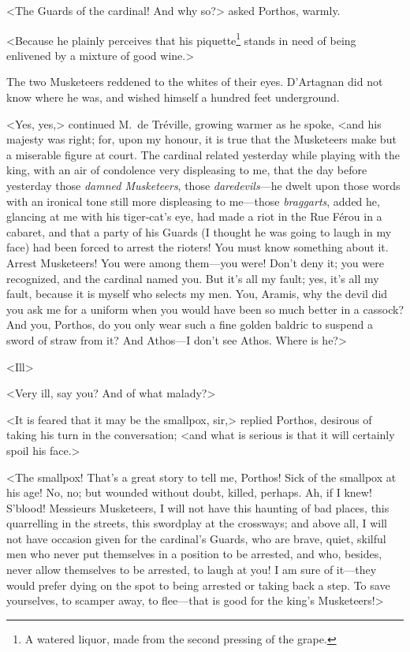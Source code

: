 <The Guards of the cardinal! And why so?> asked Porthos, warmly. 

<Because he plainly perceives that his piquette\footnote{A watered liquor, made from the second pressing of the grape.} stands in need of being enlivened by a mixture of good wine.> 

The two Musketeers reddened to the whites of their eyes. D'Artagnan did not know where he was, and wished himself a hundred feet underground. 

<Yes, yes,> continued M.~de Tréville, growing warmer as he spoke, <and his majesty was right; for, upon my honour, it is true that the Musketeers make but a miserable figure at court. The cardinal related yesterday while playing with the king, with an air of condolence very displeasing to me, that the day before yesterday those \emph{damned Musketeers}, those \emph{daredevils}—he dwelt upon those words with an ironical tone still more displeasing to me—those \emph{braggarts}, added he, glancing at me with his tiger-cat's eye, had made a riot in the Rue Férou in a cabaret, and that a party of his Guards (I thought he was going to laugh in my face) had been forced to arrest the rioters!  You must know something about it. Arrest Musketeers! You were among them—you were! Don't deny it; you were recognized, and the cardinal named you. But it's all my fault; yes, it's all my fault, because it is myself who selects my men. You, Aramis, why the devil did you ask me for a uniform when you would have been so much better in a cassock? And you, Porthos, do you only wear such a fine golden baldric to suspend a sword of straw from it? And Athos—I don't see Athos. Where is he?> 

<Ill\longdash> 

<Very ill, say you? And of what malady?> 

<It is feared that it may be the smallpox, sir,> replied Porthos, desirous of taking his turn in the conversation; <and what is serious is that it will certainly spoil his face.> 

<The smallpox! That's a great story to tell me, Porthos! Sick of the smallpox at his age! No, no; but wounded without doubt, killed, perhaps. Ah, if I knew! S'blood! Messieurs Musketeers, I will not have this haunting of bad places, this quarrelling in the streets, this swordplay at the crossways; and above all, I will not have occasion given for the cardinal's Guards, who are brave, quiet, skilful men who never put themselves in a position to be arrested, and who, besides, never allow themselves to be arrested, to laugh at you! I am sure of it—they would prefer dying on the spot to being arrested or taking back a step. To save yourselves, to scamper away, to flee—that is good for the king's Musketeers!> 

